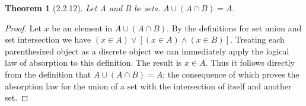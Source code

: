 \documentclass[a4paper, 12pt]{article}
\theoremstyle{plain}
\newtheorem*{theorem*}{Theorem}
\begin{document}
	
	\begin{theorem*}[2.2.12]
		Let A and B be sets. $A \cup (A \cap B) = A$.
	\end{theorem*}
	
	\begin{proof}
		Let $x$ be an element in $A \cup (A \cap B)$. By the definitions for set union and set intersection 
		we have $(x \in A) \lor [(x \in A) \land (x \in B)]$. Treating each parenthesized object as a 
		discrete object we can immediately apply the logical law of absorption to this definition. The result 
		is $x \in A$. Thus it follows directly from the definition that $A \cup (A \cap B) = A$; the consequence 
		of which proves the absorption law for the union of a set with the intersection of itself and another set.
	\end{proof}
\end{document}
